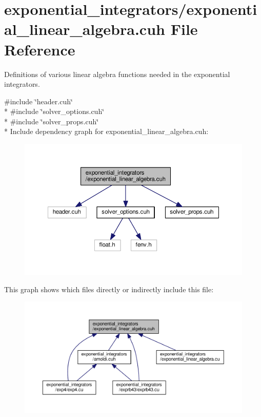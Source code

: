 \hypertarget{exponential__linear__algebra_8cuh}{}\section{exponential\+\_\+integrators/exponential\+\_\+linear\+\_\+algebra.cuh File Reference}
\label{exponential__linear__algebra_8cuh}


Definitions of various linear algebra functions needed in the exponential integrators.  


{\ttfamily \#include \char`\"{}header.\+cuh\char`\"{}}\\*
{\ttfamily \#include \char`\"{}solver\+\_\+options.\+cuh\char`\"{}}\\*
{\ttfamily \#include \char`\"{}solver\+\_\+props.\+cuh\char`\"{}}\\*
Include dependency graph for exponential\+\_\+linear\+\_\+algebra.\+cuh\+:\nopagebreak
\begin{figure}[H]
\begin{center}
\leavevmode
\includegraphics[width=350pt]{exponential__linear__algebra_8cuh__incl}
\end{center}
\end{figure}
This graph shows which files directly or indirectly include this file\+:\nopagebreak
\begin{figure}[H]
\begin{center}
\leavevmode
\includegraphics[width=350pt]{exponential__linear__algebra_8cuh__dep__incl}
\end{center}
\end{figure}
